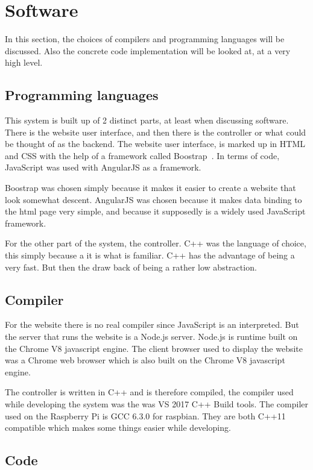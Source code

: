 \section{Software}
In this section, the choices of compilers and programming languages will be discussed. Also the concrete code implementation will be looked at, at a very high level.

\subsection{Programming languages}
This system is built up of 2 distinct parts, at least when discussing software. There is the website user interface, and then there is the controller or what could be thought of as the backend. The website user interface, is marked up in HTML and CSS with the help of a framework called Boostrap~\cite{bootstrap}. In terms of code, JavaScript was used with AngularJS as a framework. 

Boostrap was chosen simply because it makes it easier to create a website that look somewhat descent. AngularJS was chosen because it makes data binding to the html page very simple, and because it supposedly is a widely used JavaScript framework.

For the other part of the system, the controller. C++ was the language of choice, this simply because a it is what is familiar. C++ has the advantage of being a very fast. But then the draw back of being a rather low abstraction. 
 
\subsection{Compiler}
For the website there is no real compiler since JavaScript is an interpreted. But the server that runs the website is a Node.js server. Node.js is runtime built on the Chrome V8 javascript engine. The client browser used to display the website was a Chrome web browser which is also built on the Chrome V8 javascript engine. 

The controller is written in C++ and is therefore compiled, the compiler used while developing the system was the was VS 2017 C++ Build tools\cite{VC-2017}. The compiler used on the Raspberry Pi is GCC 6.3.0 for raspbian\cite{GCC}. They are both C++11 compatible which makes some things easier while developing. 

\subsection{Code}

